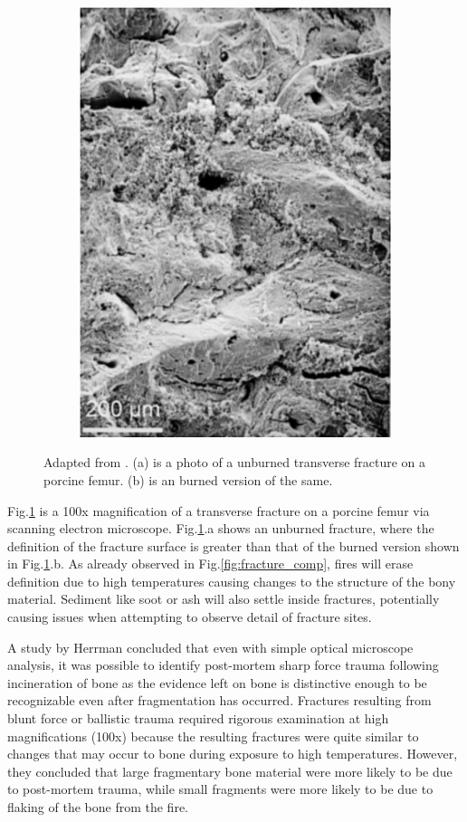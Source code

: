 \documentclass[titlepage]{article}
\begin{document}
\begin{figure}[h!]
\begin{subfigure}{.5\textwidth}
  \includegraphics[width=.7\linewidth]{burned_transverse}
  \caption{}
\end{subfigure}
\caption{Adapted from \cite{fire-bone}. (a) is a photo of a unburned transverse fracture on a porcine femur. (b) is an burned version of the same.}
\label{fig:burn_fracture}
\end{figure}

Fig.\ref{fig:burn_fracture} is a 100x magnification of a transverse fracture on a porcine femur via scanning electron microscope. Fig.\ref{fig:burn_fracture}.a shows an unburned fracture, where the definition of the fracture surface is greater than that of the burned version shown in Fig.\ref{fig:burn_fracture}.b. As already observed in Fig.\ref{fig:fracture_comp}, fires will erase definition due to high temperatures causing changes to the structure of the bony material. Sediment like soot or ash will also settle inside fractures, potentially causing issues when attempting to observe detail of fracture sites.

A study by Herrman concluded that even with simple optical microscope analysis, it was possible to identify post-mortem sharp force trauma following incineration of bone as the evidence left on bone is distinctive enough to be recognizable even after fragmentation has occurred. Fractures resulting from blunt force or ballistic trauma required rigorous examination at high magnifications (100x) because the resulting fractures were quite similar to changes that may occur to bone during exposure to high temperatures. However, they concluded that large fragmentary bone material were more likely to be due to post-mortem trauma, while small fragments were more likely to be due to flaking of the bone from the fire. \cite{fire-bone}
\end{document}
